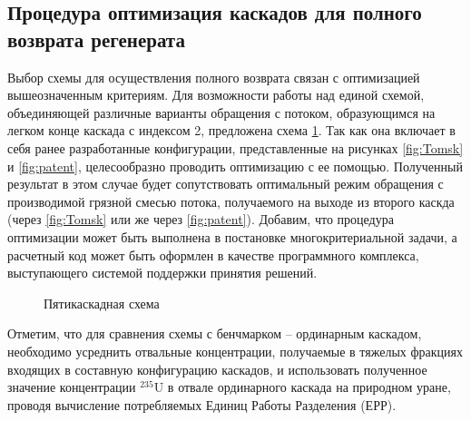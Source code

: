 \subsection{Процедура оптимизация каскадов для полного возврата регенерата}\label{sec:ch2/sec2.2}
Выбор схемы для осуществления полного возврата связан с оптимизацией вышеозначенным критериям. Для возможности работы над единой схемой, объединяющей различные варианты обращения с потоком, образующимся на легком конце каскада с индексом 2, предложена схема \ref{fig:Total scheme}. Так как она включает в себя ранее разработанные конфигурации, представленные на рисунках \ref{fig:Tomsk} и \ref{fig:patent}, целесообразно проводить оптимизацию с ее помощью. Полученный результат в этом случае будет сопутствовать оптимальный режим обращения с производимой грязной смесью потока, получаемого на выходе из второго каскда (через \ref{fig:Tomsk} или же через \ref{fig:patent}).
Добавим, что процедура оптимизации может быть выполнена в постановке многокритериальной задачи, а расчетный код может быть оформлен в качестве программного комплекса, выступающего системой поддержки принятия решений.

\begin{figure}[ht]
  \caption{Пятикаскадная схема}\label{fig:Total scheme}
\end{figure}

Отметим, что для сравнения схемы с бенчмарком -- ординарным каскадом, необходимо усреднить отвальные концентрации, получаемые в тяжелых фракциях входящих в составную конфигурацию каскадов, и использовать полученное значение концентрации $^{235}$U в отвале ординарного каскада на природном уране, проводя вычисление потребляемых Единиц Работы Разделения (ЕРР).